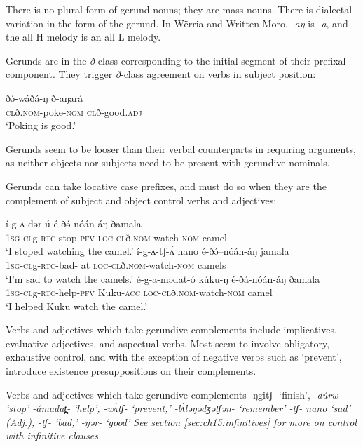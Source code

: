 There is no plural form of gerund nouns; they are mass nouns. There is dialectal variation in the form of the gerund. In W\"erria and Written Moro, \textit{-aŋ} is \textit{-a}, and the all H melody is an all L melody.


Gerunds are in the \textit{ð}-class corresponding to the initial segment of their prefixal component. They trigger \textit{ð}-class agreement on verbs in subject position:

\ea \gll 	ðə́-wáðá-ŋ		ð-aŋará\\
		\textsc{cl}ð.\textsc{nom}-poke-\textsc{nom}	 \textsc{cl}ð-good.\textsc{adj}\\
	\glt ‘Poking is good.’	
\z

Gerunds seem to be looser than their verbal counterparts in requiring arguments, as neither objects nor subjects need to be present with gerundive nominals.

Gerunds can take locative case prefixes, and must do so when they are the complement of subject and object control verbs and adjectives:

\ea \gll í-g-ʌ-dər-ú é-ðə́-nóán-áŋ ðamala\\ %
		\textsc{1sg-cl}g-\textsc{rtc}-stop-\textsc{pfv} \textsc{loc}-\textsc{cl}ð.\textsc{nom}-watch-\textsc{nom} camel\\
	\glt 	‘I stoped watching the camel.’
\ex	\gll í-g-ʌ-tʃ-ʌ́  nano é-ðə́--nóán-áŋ jamala	\\
		\textsc{1sg}-\textsc{cl}g-\textsc{rtc}-bad- at \textsc{loc}-\textsc{cl}ð.\textsc{nom}-watch-\textsc{nom} camels \\
	\glt ‘I’m sad to watch the camels.’
\ex \gll é-g-a-mədat-ó kúku-ŋ é-ðá-nóán-áŋ ðamala\\ %
		\textsc{1sg-cl}g-\textsc{rtc}-help-\textsc{pfv} Kuku-\textsc{acc} \textsc{loc}-\textsc{cl}ð.\textsc{nom}-watch-\textsc{nom} camel\\
	\glt 	‘I helped Kuku watch the camel.’
	
\z 
Verbs and adjectives which take gerundive complements include implicatives, evaluative adjectives, and aspectual verbs. Most seem to involve obligatory, exhaustive control, and with the exception of negative verbs such as `prevent', introduce existence presuppositions on their complements.

\ea  Verbs and adjectives which take gerundive complements
  {-ŋgitʃ-} `finish', \it{-dúrw-} `stop'
 {-ámadat̪-} `help', \it{-wʌ́tʃ-} `prevent,' {-lʌ́ləŋədʒətʃən-} `remember'
 \it{-tʃ- nano} `sad' (Adj.), {-tʃ-} `bad,' {-ŋər-} `good'
\z 
\z 
See section \ref{sec:ch15:infinitives} for more on control with infinitive clauses.


